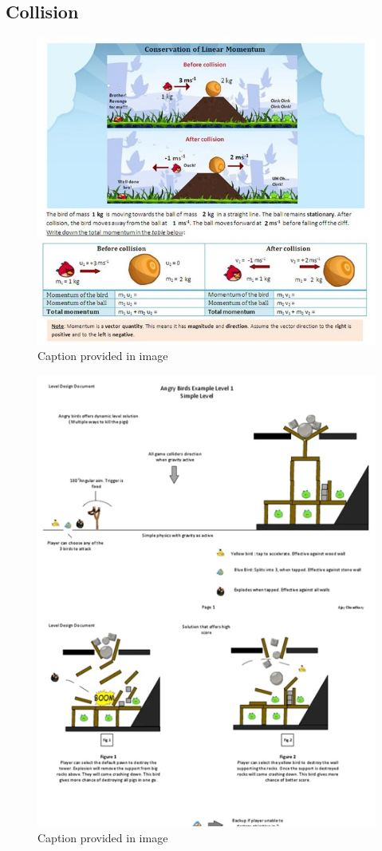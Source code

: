 \documentclass[12pt, titlepage]{article}
\begin{document}
\newpage

\subsection{Collision}

\begin{figure}[!h]
    \centering
    \includegraphics[scale=1]{Picture4.jpg} 
    \caption{Caption provided in image}
    \label{fig:FIG4}
\end{figure}

\begin{figure}[!h]
    \centering
    \includegraphics[scale=0.89]{Picture5.png} 
    \caption{Caption provided in image}
    \label{fig:FIG5}
\end{figure}
\end{document}
